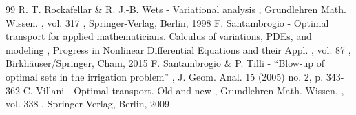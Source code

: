 \documentclass[11pt]{article}
\numberwithin{equation}{section}
\theoremstyle{definition}
\begin{document}
\begin{thebibliography}{99}
 R. T. Rockafellar \& R. J.-B. Wets - Variational analysis , Grundlehren Math. Wissen. , vol. 317 , Springer-Verlag, Berlin, 1998
 F. Santambrogio - Optimal transport for applied mathematicians. Calculus of variations, PDEs, and modeling , Progress in Nonlinear Differential Equations and their Appl. , vol. 87 , Birkhäuser/Springer, Cham, 2015
 F. Santambrogio \& P. Tilli - “Blow-up of optimal sets in the irrigation problem” , J. Geom. Anal. 15 (2005) no. 2, p. 343-362
 C. Villani - Optimal transport. Old and new , Grundlehren Math. Wissen. , vol. 338 , Springer-Verlag, Berlin, 2009
\end{thebibliography}
\end{document}
